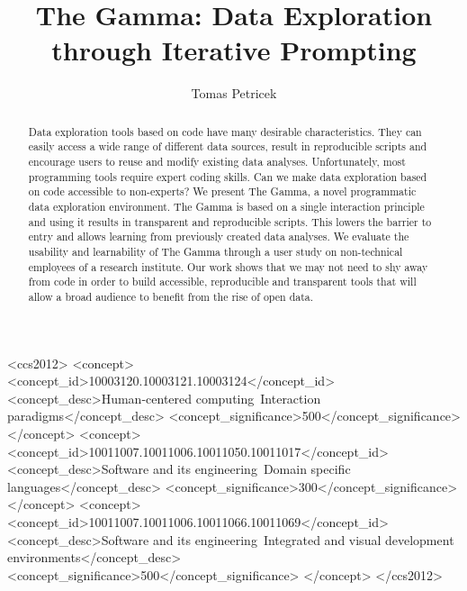 \documentclass[manuscript,review,anonymous]{acmart}
\begin{document}
\title{The Gamma: Data Exploration through Iterative Prompting}

\author{Tomas Petricek}

\begin{abstract}
  Data exploration tools based on code have many desirable characteristics. They can easily access
  a wide range of different data sources, result in reproducible scripts and encourage users to
  reuse and modify existing data analyses. Unfortunately, most programming tools require expert
  coding skills. Can we make data exploration based on code accessible to non-experts?
  We present The Gamma, a novel programmatic data exploration environment.
  The Gamma is based on a single interaction principle and using it results in transparent and
  reproducible scripts. This lowers the barrier to entry and allows learning from previously
  created data analyses. We evaluate the usability and learnability of The Gamma through a user
  study on non-technical employees of a research institute.
  Our work shows that we may not need to shy away from code in order to build accessible,
  reproducible and transparent tools that will allow a broad audience to benefit from the
  rise of open data.
\end{abstract}

\begin{CCSXML}
<ccs2012>
   <concept>
       <concept_id>10003120.10003121.10003124</concept_id>
       <concept_desc>Human-centered computing~Interaction paradigms</concept_desc>
       <concept_significance>500</concept_significance>
       </concept>
   <concept>
       <concept_id>10011007.10011006.10011050.10011017</concept_id>
       <concept_desc>Software and its engineering~Domain specific languages</concept_desc>
       <concept_significance>300</concept_significance>
       </concept>
   <concept>
       <concept_id>10011007.10011006.10011066.10011069</concept_id>
       <concept_desc>Software and its engineering~Integrated and visual development environments</concept_desc>
       <concept_significance>500</concept_significance>
       </concept>
 </ccs2012>
\end{CCSXML}

\end{document}
